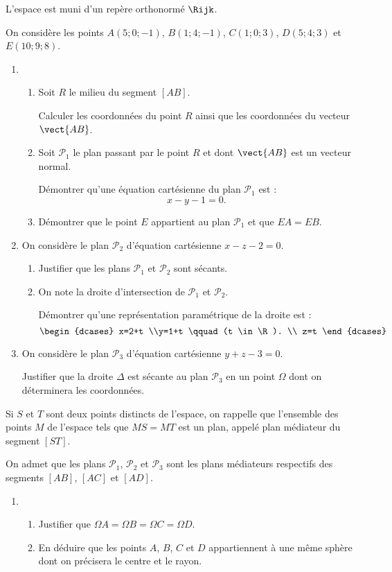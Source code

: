 L'espace est muni d'un repère orthonormé $\Rijk$.

\smallskip

On considère les points $A(5;0;-1)$, $B(1;4;-1)$, $C(1;0;3)$, $D(5;4;3)$ et $E(10;9;8)$.

\begin{enumerate}
	\item 
	\begin{enumerate}
		\item Soit $R$ le milieu du segment $[AB]$.
		
		Calculer les coordonnées du point $R$ ainsi que les coordonnées du vecteur $\vect{AB}$.
		\item Soit $\mathcal{P}_1$ le plan passant par le point $R$ et dont $\vect{AB}$ est un vecteur normal.
		
		Démontrer qu'une équation cartésienne du plan $\mathcal{P}_1$ est : \[ x-y-1=0.\]
		\item Démontrer que le point $E$ appartient au plan $\mathcal{P}_1$ et que $EA = EB$.
	\end{enumerate}
	\item On considère le plan $\mathcal{P}_2$ d'équation cartésienne $x-z-2=0$.
	\begin{enumerate}
		\item Justifier que les plans $\mathcal{P}_1$ et $\mathcal{P}_2$ sont sécants.
		\item On note la droite d'intersection de $\mathcal{P}_1$ et $\mathcal{P}_2$.
		
		Démontrer qu'une représentation paramétrique de la droite est : \[ \begin{dcases} x=2+t \\y=1+t \qquad (t \in \R). \\ z=t \end{dcases} \]
	\end{enumerate}
	\item On considère le plan $\mathcal{P}_3$ d'équation cartésienne $y+z-3=0$.
	
	Justifier que la droite $\Delta$ est sécante au plan $\mathcal{P}_3$ en un point $\Omega$ dont on déterminera les coordonnées. 
\end{enumerate}

Si $S$ et $T$ sont deux points distincts de l'espace, on rappelle que l'ensemble des points $M$ de l'espace tels que $MS= MT$ est un plan, appelé plan médiateur du segment $[ST]$.

On admet que les plans $\mathcal{P}_1$, $\mathcal{P}_2$ et $\mathcal{P}_3$ sont les plans médiateurs respectifs des segments $[AB]$, $[AC]$ et $[AD]$.

\begin{enumerate}[resume]
	\item 
	\begin{enumerate}
		\item Justifier que $\Omega A = \Omega B = \Omega C = \Omega D$.
		\item En déduire que les points $A$, $B$, $C$ et $D$ appartiennent à une même sphère dont on précisera le centre et le rayon. 
	\end{enumerate}
\end{enumerate}
